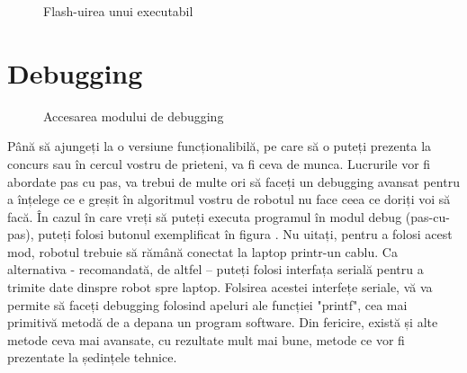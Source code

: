 \begin{figure}
  \vspace{-20pt}
  \vspace{-15pt}
  \caption{\label{fig:CodeWarrior-FlashProgrammer2} Flash-uirea unui executabil}
  \vspace{-20pt}
\end{figure}

\section{Debugging}

\begin{figure}
  \vspace{-20pt}
  \vspace{-15pt}
  \caption{\label{fig:CodeWarrior-Debugging} Accesarea modului de debugging}
  \vspace{-20pt}
\end{figure}

Până să ajungeți la o versiune funcționalibilă, pe care să o puteți prezenta la concurs sau în cercul vostru de prieteni, va fi ceva de munca. Lucrurile vor fi abordate pas cu pas, va trebui de multe ori să faceți un debugging avansat pentru a înțelege ce e greșit în algoritmul vostru de robotul nu face ceea ce doriți voi să facă. În cazul în care vreți să puteți executa programul în modul debug (pas-cu-pas), puteți folosi butonul exemplificat în figura . Nu uitați, pentru a folosi acest mod, robotul trebuie să rămână conectat la laptop printr-un cablu. Ca alternativa - recomandată, de altfel – puteți folosi interfața serială pentru a trimite date dinspre robot spre laptop. Folsirea acestei interfețe seriale, vă va permite să faceți debugging folosind apeluri ale funcției "printf", cea mai primitivă metodă de a depana un program software. Din fericire, există și alte metode ceva mai avansate, cu rezultate mult mai bune, metode ce vor fi prezentate la ședințele tehnice.


